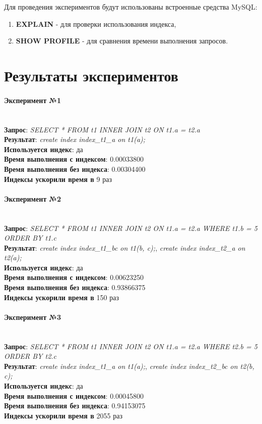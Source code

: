 Для проведения экспериментов будут использованы встроенные средства MySQL: 
\begin{enumerate}
\item \textbf{EXPLAIN} - для проверки использования индекса,
\item \textbf{SHOW PROFILE} - для сравнения времени выполнения запросов.
\end{enumerate}

\section{Результаты экспериментов}

\paragraph{Эксперимент №1}\\
\textbf{Запрос}: \textit{SELECT * FROM t1 INNER JOIN t2 ON t1.a = t2.a}\\
\textbf{Результат}: \textit{create index index_t1_a on t1(a);}\\
\textbf{Используется индекс}: да\\
\textbf{Время выполнения с индексом}: 0.00033800\\
\textbf{Время выполнения без индекса}: 0.00304400\\
\textbf{Индексы ускорили время в} 9 раз\\

\paragraph{Эксперимент №2}\\
\textbf{Запрос}: \textit{SELECT * FROM t1 INNER JOIN t2 ON t1.a = t2.a WHERE t1.b = 5 ORDER BY t1.c}\\
\textbf{Результат}: \textit{create index index_t1_bc on t1(b, c);}, \textit{create index index_t2_a on t2(a);}\\
\textbf{Используется индекс}: да\\
\textbf{Время выполнения с индексом}: 0.00623250\\
\textbf{Время выполнения без индекса}: 0.93866375\\
\textbf{Индексы ускорили время в} 150 раз\\

\paragraph{Эксперимент №3}\\
\textbf{Запрос}: \textit{SELECT * FROM t1 INNER JOIN t2 ON t1.a = t2.a WHERE t2.b = 5 ORDER BY t2.c}\\
\textbf{Результат}: \textit{create index index_t1_a on t1(a);}, \textit{create index index_t2_bc on t2(b, c);}\\
\textbf{Используется индекс}: да\\
\textbf{Время выполнения с индексом}: 0.00045800\\
\textbf{Время выполнения без индекса}: 0.94153075\\
\textbf{Индексы ускорили время в} 2055 раз\\

